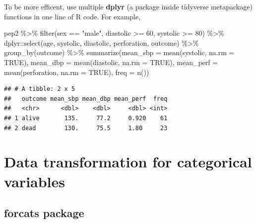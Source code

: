 \documentclass[
  10pt,
]{krantz}
\newenvironment{Shaded}{\begin{snugshade}}{\end{snugshade}}
\newcommand{\AttributeTok}[1]{\textcolor[rgb]{0.77,0.63,0.00}{#1}}
\newcommand{\ConstantTok}[1]{\textcolor[rgb]{0.00,0.00,0.00}{#1}}
\newcommand{\DecValTok}[1]{\textcolor[rgb]{0.00,0.00,0.81}{#1}}
\newcommand{\FunctionTok}[1]{\textcolor[rgb]{0.00,0.00,0.00}{#1}}
\newcommand{\NormalTok}[1]{#1}
\newcommand{\SpecialCharTok}[1]{\textcolor[rgb]{0.00,0.00,0.00}{#1}}
\newcommand{\StringTok}[1]{\textcolor[rgb]{0.31,0.60,0.02}{#1}}
\begin{document}
To be more efficent, use multiple \textbf{dplyr} (a package inside tidyverse metapackage) functions in one line of R code. For example,

\begin{Shaded}
\begin{Highlighting}[]
\NormalTok{pep2 }\SpecialCharTok{\%\textgreater{}\%} \FunctionTok{filter}\NormalTok{(sex }\SpecialCharTok{==} \StringTok{"male"}\NormalTok{, diastolic }\SpecialCharTok{\textgreater{}=} \DecValTok{60}\NormalTok{, systolic }\SpecialCharTok{\textgreater{}=} \DecValTok{80}\NormalTok{) }\SpecialCharTok{\%\textgreater{}\%} 
\NormalTok{  dplyr}\SpecialCharTok{::}\FunctionTok{select}\NormalTok{(age, systolic, diastolic, perforation, outcome) }\SpecialCharTok{\%\textgreater{}\%}
  \FunctionTok{group\_by}\NormalTok{(outcome) }\SpecialCharTok{\%\textgreater{}\%}
  \FunctionTok{summarize}\NormalTok{(}\AttributeTok{mean\_sbp =} \FunctionTok{mean}\NormalTok{(systolic, }\AttributeTok{na.rm =} \ConstantTok{TRUE}\NormalTok{), }
            \AttributeTok{mean\_dbp =} \FunctionTok{mean}\NormalTok{(diastolic, }\AttributeTok{na.rm =} \ConstantTok{TRUE}\NormalTok{),}
            \AttributeTok{mean\_perf =} \FunctionTok{mean}\NormalTok{(perforation, }\AttributeTok{na.rm =} \ConstantTok{TRUE}\NormalTok{),}
            \AttributeTok{freq =} \FunctionTok{n}\NormalTok{())}
\end{Highlighting}
\end{Shaded}

\begin{verbatim}
## # A tibble: 2 x 5
##   outcome mean_sbp mean_dbp mean_perf  freq
##   <chr>      <dbl>    <dbl>     <dbl> <int>
## 1 alive       135.     77.2     0.920    61
## 2 dead        130.     75.5     1.80     23
\end{verbatim}

\hypertarget{data-transformation-for-categorical-variables}{%
\section{\texorpdfstring{Data transformation for categorical variables}{Data transformation for categorical variables}}\label{data-transformation-for-categorical-variables}}

\hypertarget{forcats-package}{%
\subsection{\texorpdfstring{\textbf{forcats} package}{forcats package}}\label{forcats-package}}
\end{document}
